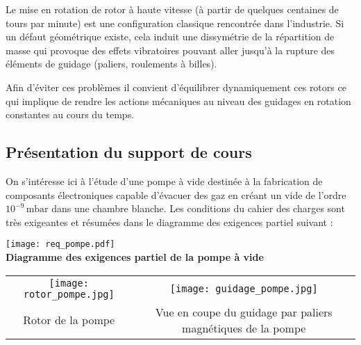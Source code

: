 Le mise en rotation de rotor à haute vitesse (à partir de quelques centaines de tours par minute) est une configuration classique rencontrée dans l'industrie. Si un défaut géométrique existe, cela induit une dissymétrie de la répartition de masse qui provoque des effets vibratoires pouvant aller jusqu'à la rupture des éléments de guidage (paliers, roulements à billes).

Afin d'éviter ces problèmes il convient d'équilibrer dynamiquement ces rotors ce qui implique de rendre les actions mécaniques au niveau des guidages en rotation constantes au cours du temps.
%

\subsection{Présentation du support de cours}

\begin{exemple}
On s'intéresse ici à l'étude d'une pompe à vide destinée à la fabrication de composants électroniques capable d'évacuer des gaz en créant un vide de l'ordre $10^{-9}\,\text{mbar}$ dans une chambre blanche. Les conditions du cahier des charges sont très exigeantes et résumées dans le diagramme des exigences partiel suivant : 

\begin{center}
\texttt{[image: req\_pompe.pdf]}\\
\textbf{Diagramme des exigences partiel de la pompe à vide}
\end{center}
\end{exemple}

\begin{center}
\begin{tabular}{cc}
\texttt{[image: rotor\_pompe.jpg]}
&
\texttt{[image: guidage\_pompe.jpg]}
\\
Rotor de la pompe
&
Vue en coupe du guidage par paliers magnétiques de la pompe
\end{tabular}
\end{center}





